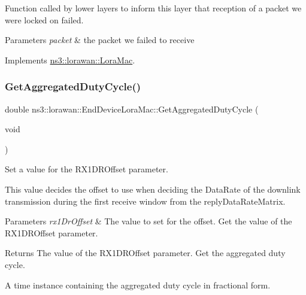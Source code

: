 Function called by lower layers to inform this layer that reception of a packet we were locked on failed.


\begin{DoxyParams}{Parameters}
{\em packet} & the packet we failed to receive \\
\hline
\end{DoxyParams}


Implements \hyperlink{classns3_1_1lorawan_1_1LoraMac_afcd55472bbfa299c4d0239d5fa9957e3}{ns3\+::lorawan\+::\+Lora\+Mac}.

\mbox{\label{classns3_1_1lorawan_1_1EndDeviceLoraMac_ae974b8539199bbc493ba5436d1689860}} 
\subsubsection{\texorpdfstring{Get\+Aggregated\+Duty\+Cycle()}{GetAggregatedDutyCycle()}}
{\footnotesize\ttfamily double ns3\+::lorawan\+::\+End\+Device\+Lora\+Mac\+::\+Get\+Aggregated\+Duty\+Cycle (\begin{DoxyParamCaption}\item[{void}]{ }\end{DoxyParamCaption})}

Set a value for the R\+X1\+D\+R\+Offset parameter.

This value decides the offset to use when deciding the Data\+Rate of the downlink transmission during the first receive window from the reply\+Data\+Rate\+Matrix.


\begin{DoxyParams}{Parameters}
{\em rx1\+Dr\+Offset} & The value to set for the offset. Get the value of the R\+X1\+D\+R\+Offset parameter.\\
\hline
\end{DoxyParams}
\begin{DoxyReturn}{Returns}
The value of the R\+X1\+D\+R\+Offset parameter. Get the aggregated duty cycle.

A time instance containing the aggregated duty cycle in fractional form. 
\end{DoxyReturn}
\mbox{\label{classns3_1_1lorawan_1_1EndDeviceLoraMac_a542adf7ed65bee26b4d43ed49f54a3f4}} 
